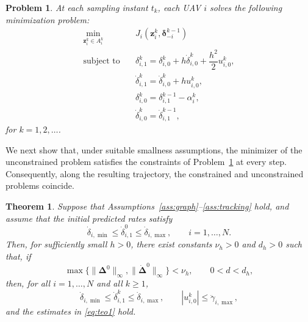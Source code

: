 \documentclass[letterpaper,journal]{IEEEtran}
\newtheorem{problem}{Problem}
\newtheorem{theorem}{Theorem}
\begin{document}
\begin{problem}\label{Discrete}
At each sampling instant \(t_k\), each UAV \(i\) solves the following minimization problem:
\begin{equation*}
\begin{aligned}
\min_{\mathbf{z}^{k}_{i}\in A_{i}^k} \quad 
& J_i\!\left(\mathbf{z}^{k}_{i}, \bm{\delta}^{k-1}_{-i}\right)
\\
\text{subject to} \quad
& \delta_{i,1}^k
=
\delta_{i,0}^k
+
h\dot\delta_{i,0}^k
+
\dfrac{h^2}{2}u_{i,0}^k,
\\[3pt]
& \dot\delta_{i,1}^k
=
\dot\delta_{i,0}^k
+
hu_{i,0}^k,
\\[3pt]
& \delta^{k}_{i,0}
=
\delta^{k-1}_{i,1}
-
\alpha_{i}^{k},
\\[3pt]
& \dot{\delta}^{k}_{i,0}
=
\dot{\delta}^{k-1}_{i,1},
\end{aligned}
\end{equation*}
for \(k=1,2,\dots\).
\end{problem}
We next show that, under suitable smallness assumptions, the minimizer of the unconstrained problem satisfies the constraints of Problem~\ref{Discrete} at every step. Consequently, along the resulting trajectory, the constrained and unconstrained problems coincide.
\begin{theorem}\label{theorem-main}
Suppose that Assumptions~\ref{ass:graph}--\ref{ass:tracking} hold, and assume that the initial predicted rates satisfy
\[
\dot{\delta}_{i,\min}\le \dot{\delta}^{0}_{i,1}\le \dot{\delta}_{i,\max},
\qquad i=1,\dots,N.
\]
Then, for sufficiently small \(h>0\), there exist constants \(\nu_h>0\) and \(d_h>0\) such that, if
\[
\max\{\|\bm{\Delta}^0\|_\infty,\|\dot{\bm{\Delta}}^0\|_\infty\}<\nu_h,
\qquad
0<d<d_h,
\]
then, for all \(i=1,\dots,N\) and all \(k\ge 1\),
\[
\dot{\delta}_{i,\min}\le \dot{\delta}^{k}_{i,1}\le \dot{\delta}_{i,\max},
\qquad
|u^k_{i,0}|\le \ddot{\gamma}_{i,\max},
\]
and the estimates in \eqref{eq:teo1} hold.
\end{theorem}
\end{document}
